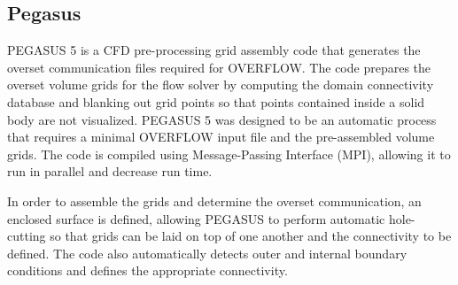 



\subsection{Pegasus}

PEGASUS 5 is a CFD pre-processing grid assembly code that generates the overset communication files required for OVERFLOW. The code prepares the overset volume grids for the flow solver by computing the domain connectivity database and blanking out grid points so that points contained inside a solid body are not visualized. PEGASUS 5 was designed to be an automatic process that requires a minimal OVERFLOW input file and the pre-assembled volume grids. The code is compiled using Message-Passing Interface (MPI), allowing it to run in parallel and decrease run time. 

In order to assemble the grids and determine the overset communication, an enclosed surface is defined, allowing PEGASUS to perform automatic hole-cutting so that grids can be laid on top of one another and the connectivity to be defined. The code also automatically detects outer and internal boundary conditions and defines the appropriate connectivity. \cite{Rogers2016}





